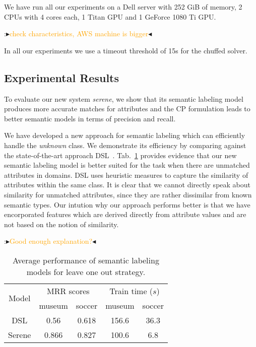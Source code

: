 \documentclass[letterpaper]{article} %
\newcommand{\authornote}[3]{
  {\fbox{\sc 
  #1}:$\blacktriangleright$\textcolor{#2}{\small{#3}}$\blacktriangleleft$}%
}
\newcommand{\npr}[1]{\authornote{NPR}{orange}{#1}}
\begin{document}
We have run all our experiments on a Dell server with 252 GiB of memory, 2 CPUs with 4 cores each, 1 Titan GPU and 1 GeForce 1080 Ti GPU.
\npr{check characteristics, AWS machine is bigger}
In all our experiments we use a timeout threshold of 15s for the chuffed solver.

\subsection{Experimental Results}

To evaluate our new system \emph{serene}, we show that its semantic labeling model produces more accurate matches for attributes and the CP formulation leads to better semantic models in terms of precision and recall.

We have developed a new approach for semantic labeling which can efficiently handle the \emph{unknown} class.
We demonstrate its efficiency by comparing against the state-of-the-art approach DSL~\cite{Pham:semantic}.
Tab.~\ref{tab:semlab} provides evidence that our new semantic labeling model is better suited for the task when there are unmatched attributes in domains.
DSL uses heuristic measures to capture the similarity of attributes within the same class.
It is clear that we cannot directly speak about similarity for unmatched attributes, since they are rather dissimilar from known semantic types.
Our intution why our approach performs better is that we have encorporated features which are derived directly from attribute values and are not based on the notion of similarity.
\npr{Good enough explanation?}

\begin{table}[t]\small
  \centering
  \caption{Average performance of semantic labeling models for leave one out strategy.}
  	\label{tab:semlab}
  	\begin{tabular}{c|cc|cc} 
  		\hline
  		\multirow{2}{*}{Model} & \multicolumn{2}{c|}{MRR scores} & \multicolumn{2}{c}{Train time ($s$)}\\
  		 & museum & soccer & museum & soccer\\
  		\hline
  		DSL & 0.56 & 0.618 & 156.6 & 36.3\\
 		Serene & 0.866 & 0.827 & 100.6 & 6.8\\
  		\hline
		\end{tabular} 
\end{table}
\end{document}
